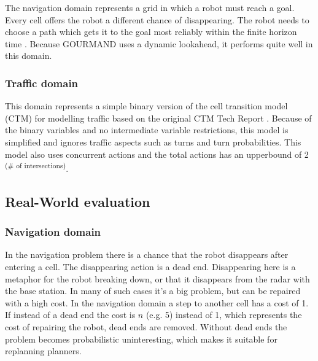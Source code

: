 \documentclass[runningheads,a4paper]{llncs}
\begin{document}
The navigation domain represents a grid in which a robot must reach a goal. Every cell offers the robot a different chance of disappearing. The robot needs to choose a path which gets it to the goal most reliably within the finite horizon time \cite{sanner2011navigation}. Because GOURMAND uses a dynamic lookahead, it performs quite well in this domain.


\subsubsection{Traffic domain}
This domain represents a simple binary version of the cell transition model (CTM) for modelling traffic based on the original CTM Tech Report \cite{sanner2011traffic}. Because of the binary variables and no intermediate variable restrictions, this model is simplified and ignores traffic aspects such as turns and turn probabilities. This model also uses concurrent actions and the total actions has an upperbound of 2\textsuperscript{ (\# of intersections)}.


%
%

\subsection{Real-World evaluation}

\subsubsection{Navigation domain}

In the navigation problem there is a chance that the robot disappears after
entering a cell. The disappearing action is a dead end. Disappearing here is a
metaphor for the robot breaking down, or that it disappears from the radar with
the base station. In many of such cases it's a big problem, but can be repaired
with a high cost. In the navigation domain a step to another cell has a cost of
1. If instead of a dead end the cost is $n$ (e.g. 5) instead of 1, which
represents the cost of repairing the robot, dead ends are removed. Without dead
ends the problem becomes probabilistic uninteresting, which makes it suitable for
replanning planners.
\end{document}
